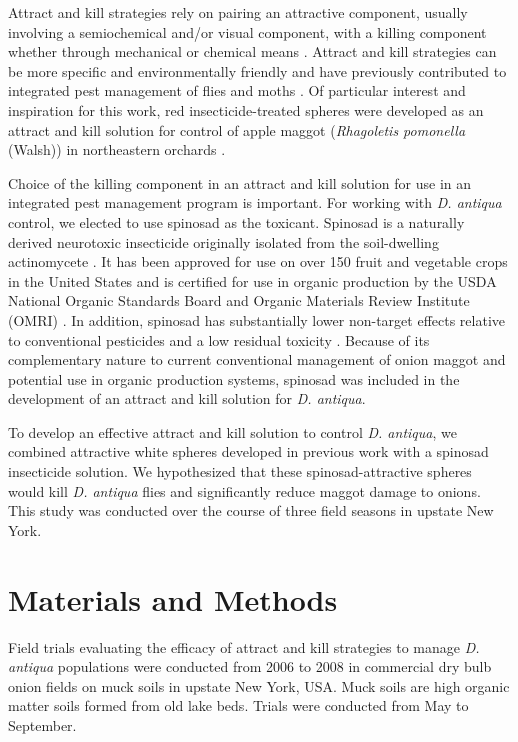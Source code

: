 \documentclass[alpha-refs]{wiley-article}
\begin{document}
Attract and kill strategies rely on pairing an attractive component, usually involving a semiochemical and/or visual component, with a killing component whether through mechanical or chemical means \citep{gregg2018advances}.  Attract and kill strategies can be more specific and environmentally friendly and have previously contributed to integrated pest management of flies and moths \citep{gregg2018advances}.  Of particular interest and inspiration for this work, red insecticide-treated spheres were developed as an attract and kill solution for control of apple maggot (\textit{Rhagoletis pomonella} (Walsh)) in northeastern orchards \citep{bostanian2001attract,duan1995control}.  

Choice of the killing component in an attract and kill solution for use in an integrated pest management program is important. For working with \textit{D. antiqua} control, we elected to use spinosad as the toxicant. Spinosad is a naturally derived neurotoxic insecticide originally isolated from the soil-dwelling actinomycete \citep{Saccharopolyspora spinosa} \citep{racke2007reduced}. It has been approved for use on over 150 fruit and vegetable crops in the United States and is certified for use in organic production by the USDA National Organic Standards Board and Organic Materials Review Institute (OMRI) \citep{racke2007reduced,williams2003naturally}. In addition, spinosad has substantially lower non-target effects relative to conventional pesticides and a low residual toxicity \citep{williams2003naturally}. Because of its complementary nature to current conventional management of onion maggot and potential use in organic production systems, spinosad was included in the development of an attract and kill solution for \textit{D. antiqua}.

To develop an effective attract and kill solution to control \textit{D. antiqua}, we combined attractive white spheres developed in previous work \citep{willett2019} with a spinosad insecticide solution. We hypothesized that these spinosad-attractive spheres would kill \textit{D. antiqua} flies and significantly reduce maggot damage to onions. This study was conducted over the course of three field seasons in upstate New York.

\section{Materials and Methods}

Field trials evaluating the efficacy of attract and kill strategies to manage \textit{D. antiqua} populations were conducted from 2006 to 2008 in commercial dry bulb onion fields on muck soils in upstate New York, USA.  Muck soils are high organic matter soils formed from old lake beds.  Trials were conducted from May to September.  
\end{document}
